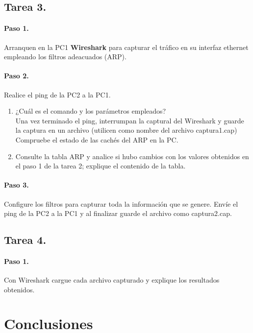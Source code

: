     \subsection{Tarea 3.}
        \paragraph{Paso 1.}
        Arranquen en la PC1 \textbf{Wireshark} para capturar el tráfico en su interfaz ethernet empleando los filtros adeacuados (ARP).
        \paragraph{Paso 2.}
        Realice el ping de la PC2 a la PC1.
        \begin{enumerate}
            \item ¿Cuál es el comando y los parámetros empleados?\\
            Una vez terminado el ping, interrumpan la captural del Wireshark y guarde la captura en un archivo (utilicen como nombre del archivo captura1.cap)
            Compruebe el estado de las cachés del ARP en la PC.
            \item Consulte la tabla ARP y analice si hubo cambios con los valores obtenidos en el paso 1 de la tarea 2; explique el contenido de la tabla.
        \end{enumerate}
        \paragraph{Paso 3.}
        Configure los filtros para capturar toda la información que se genere. Envíe el ping de la PC2 a la PC1 y al finalizar guarde el archivo como captura2.cap.
    \subsection{Tarea 4.}
        \paragraph{Paso 1.}
        Con Wireshark cargue cada archivo capturado y explique los resultados obtenidos.

\section{Conclusiones}

